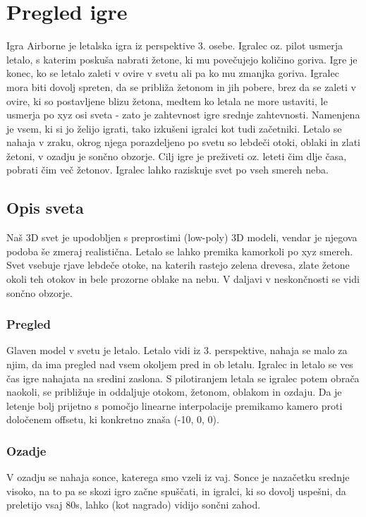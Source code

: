 \documentclass[a4paper]{article}
\begin{document}
\section{Pregled igre}%
Igra Airborne je letalska igra iz perspektive 3. osebe. Igralec oz. pilot usmerja letalo, s katerim poskuša nabrati žetone, ki mu povečujejo količino goriva. Igre je konec, ko se letalo zaleti v ovire v svetu ali pa ko mu zmanjka goriva. Igralec mora biti dovolj spreten, da se približa žetonom in jih pobere, brez da se zaleti v ovire, ki so postavljene blizu žetona, medtem ko letala ne more ustaviti, le usmerja po xyz osi sveta - zato je zahtevnost igre srednje zahtevnosti. Namenjena je vsem, ki si jo želijo igrati, tako izkušeni igralci kot tudi začetniki. Letalo se nahaja v zraku, okrog njega porazdeljeno po svetu so lebdeči otoki, oblaki in zlati žetoni, v ozadju je sončno obzorje. Cilj igre je preživeti oz. leteti čim dlje časa, pobrati čim več žetonov. Igralec lahko raziskuje svet po vseh smereh neba.

\subsection{Opis sveta}%
Naš 3D svet je upodobljen s preprostimi (low-poly) 3D modeli, vendar je njegova podoba še zmeraj realistična. Letalo se lahko premika kamorkoli po xyz smereh. Svet vsebuje rjave lebdeče otoke, na katerih rastejo zelena drevesa, zlate žetone okoli teh otokov in bele prozorne oblake na nebu. V daljavi v neskončnosti se vidi sončno obzorje.

\subsubsection{Pregled}%
Glaven model v svetu je letalo. Letalo vidi iz 3. perspektive, nahaja se malo za njim, da ima pregled nad vsem okoljem pred in ob letalu. Igralec in letalo se ves čas igre nahajata na sredini zaslona. S pilotiranjem letala se igralec potem obrača naokoli, se približuje in oddaljuje otokom, žetonom, oblakom in ozdaju. Da je letenje bolj prijetno s pomočjo linearne interpolacije premikamo kamero proti določenem offsetu, ki konkretno znaša (-10, 0, 0).

\subsubsection{Ozadje}%
V ozadju se nahaja sonce, katerega smo vzeli iz vaj. Sonce je nazačetku srednje visoko, na to pa se skozi igro začne spuščati, in igralci, ki so dovolj uspešni, da preletijo vsaj 80s, lahko (kot nagrado) vidijo sončni zahod. 
\end{document}
